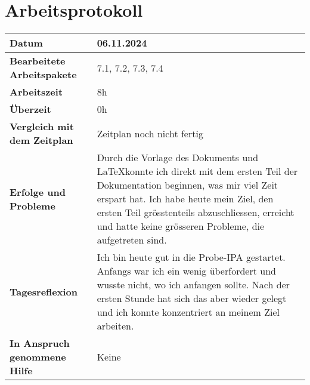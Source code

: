 \chapter{Arbeitsprotokoll}\label{ch:arbeitsprotokoll}
\renewcommand{\arraystretch}{1.5}

\begin{longtable}{p{}|p{}}
	\hline
	\textbf{Datum}                       & 06.11.2024            \\
	\hline
	\textbf{Bearbeitete Arbeitspakete}   & 7.1, 7.2, 7.3, 7.4                  \\
	\hline
	\textbf{Arbeitszeit}                 & 8h                                    \\
	\hline
	\textbf{Überzeit}                    & 0h                                    \\
	\hline
	\textbf{Vergleich mit dem Zeitplan}  & Zeitplan noch nicht fertig \\
	\hline
	\textbf{Erfolge und Probleme} & Durch die Vorlage des Dokuments und \LaTeX konnte ich direkt mit dem ersten Teil der Dokumentation beginnen, was mir viel Zeit erspart hat. Ich habe heute mein Ziel, den ersten Teil grösstenteils abzuschliessen, erreicht und hatte keine grösseren Probleme, die aufgetreten sind.
	\\
	\hline
	\textbf{Tagesreflexion} & Ich bin heute gut in die Probe-IPA gestartet. Anfangs war ich ein wenig überfordert und wusste nicht, wo ich anfangen sollte. Nach der ersten Stunde hat sich das aber wieder gelegt und ich konnte konzentriert an meinem Ziel arbeiten.
	\\
	\hline
	\textbf{In Anspruch genommene Hilfe} & Keine                              \\
	\hline
\end{longtable}\label{tab:arbeitsprotokoll-06.11.2024}
\newpage

